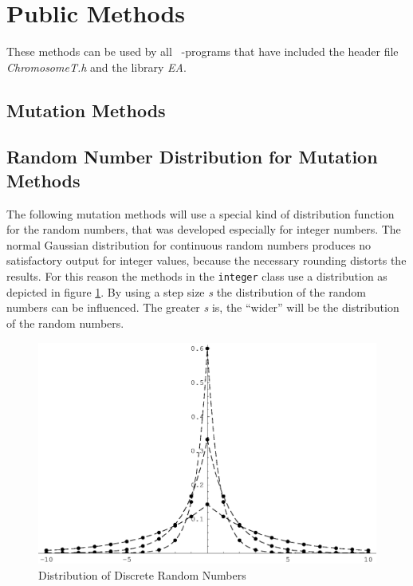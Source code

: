 \section{Public Methods}

These methods can be used by all \cpp\ -programs that have included
the header file {\em ChromosomeT.h} and the library {\em EA}.

\subsection{Mutation Methods}

\subsection{Random Number Distribution for Mutation Methods}

The following mutation methods will use a special kind of
distribution function for the random numbers, that was
developed especially for integer numbers.
The normal Gaussian distribution for continuous random numbers
produces no satisfactory output for integer values, because
the necessary rounding distorts the results. 
For this reason the methods in the {\tt integer} class
use a distribution as depicted in figure \ref{verteilung}.
By using a step size {\em s} the distribution of the
random numbers can be influenced. The greater {\em s} is,
the ``wider'' will be the distribution of the random numbers.

\begin{figure}[ht]
    \vspace*{-30ex}
    \centerline{
        \hfill
        \includegraphics[width=\textwidth]{diffGeom.eps}
        \hfill
    }
    \vspace*{-30ex}
    \caption[Distribution of Discrete Random Numbers]{
        \label{verteilung}
        Distribution of Discrete Random Numbers
    }
\end{figure}

